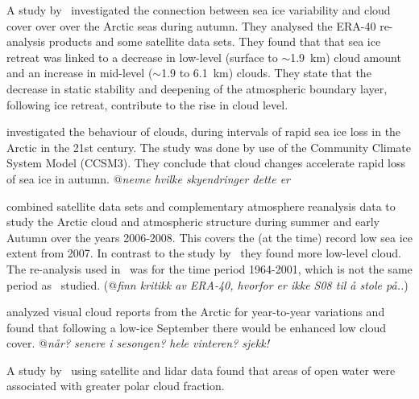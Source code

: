 A study by~\citet{Schweiger2008} investigated the connection between sea ice variability and cloud cover over over the Arctic seas during autumn. They analysed the ERA-40 re-analysis products and some satellite data sets. %
They found that that sea ice retreat was linked to a decrease in low-level (surface to $\sim$1.9~km) cloud amount and an increase in mid-level ($\sim$1.9 to 6.1~km) clouds. They state that the decrease in static stability and deepening of the atmospheric boundary layer, following ice retreat, contribute to the rise in cloud level. 

\citet{Vavrus2010} investigated the behaviour of clouds, during intervals of rapid sea ice loss in the Arctic in the 21st century. The study was done by use of the Community Climate System Model (CCSM3). They conclude that cloud changes accelerate rapid loss of sea ice in autumn. @\textit{nevne hvilke skyendringer dette er} %

\citet{Kay2009} combined satellite data sets and complementary atmosphere reanalysis data to study the Arctic cloud and atmospheric structure during summer and early Autumn over the years 2006-2008. This covers the (at the time) record low sea ice extent from 2007. In contrast to the study by~\citet{Schweiger2008} they found more low-level cloud. The re-analysis used in~\citet{Schweiger2008} was for the time period 1964-2001, which is not the same period as~\citet{Kay2009} studied. (@\textit{finn kritikk av ERA-40, hvorfor er ikke S08 til å stole på..})

\citet{Eastman2010a} analyzed visual cloud reports from the Arctic for year-to-year variations and found that following a low-ice September there would be enhanced low cloud cover. @\textit{når? senere i sesongen? hele vinteren? sjekk!}

A study by~\citet{Palm2010} using satellite and lidar data  found that areas of open water were associated with greater polar cloud fraction. %

